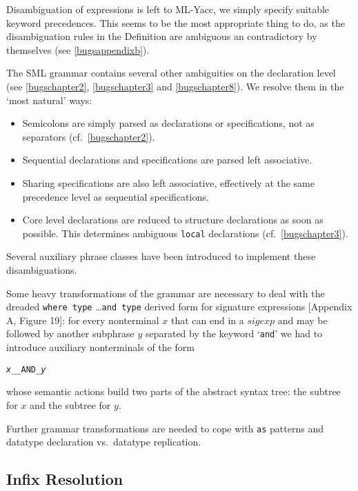 \documentclass[twoside,titlepage]{article}
\begin{document}
Disambiguation of expressions is left to ML-Yacc, we simply specify suitable keyword precedences. This seems to be the most appropriate thing to do, as the disambiguation rules in the Definition are ambiguous an contradictory by themselves (see \ref{bugsappendixb}).

The SML grammar contains several other ambiguities on the declaration level (see \ref{bugschapter2}, \ref{bugschapter3} and \ref{bugschapter8}). We resolve them in the `most natural' ways:

\begin{itemize}
\setlength{\parskip}{0ex}
\item Semicolons are simply parsed as declarations or specifications, not as separators (cf.\ \ref{bugschapter2}).
\item Sequential declarations and specifications are parsed left associative.
\item Sharing specifications are also left associative, effectively at the same precedence level as sequential specifications.
\item Core level declarations are reduced to structure declarations as soon as possible. This determines ambiguous {\tt local} declarations (cf.\ \ref{bugschapter3}).
\end{itemize}

Several auxiliary phrase classes have been introduced to implement these disambiguations.

Some heavy transformations of the grammar are necessary to deal with the dreaded {\tt where type} \dots {\tt and type} derived form for signature expressions [Appendix A, Figure 19]: for every nonterminal $x$ that can end in a $\mathit{sigexp}$ and may be followed by another subphrase $y$ separated by the keyword `{\tt{and}}' we had to introduce auxiliary nonterminals of the form

\begin{quoting}
{\tt {\sl{x}}\_\_AND\_{\sl{y}}}
\end{quoting}

whose semantic actions build two parts of the abstract syntax tree: the subtree for $x$ and the subtree for $y$.

Further grammar transformations are needed to cope with {\tt as} patterns and datatype declaration vs.\ datatype replication.


\subsection{Infix Resolution}
\label{infix}
\end{document}
